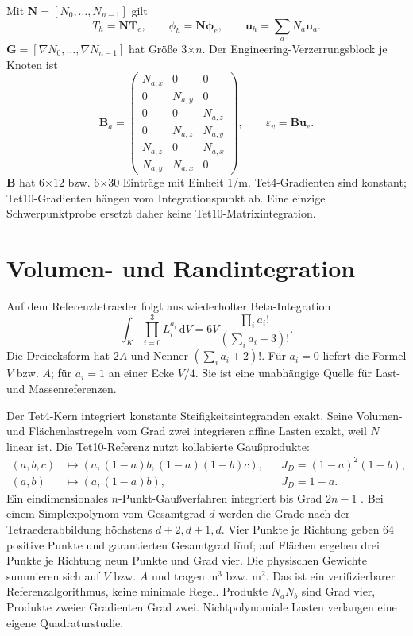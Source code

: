 Mit $\mathbf N=[N_0,\ldots,N_{n-1}]$ gilt
\begin{equation}
T_h=\mathbf N\mathbf T_e,\qquad
\phi_h=\mathbf N\boldsymbol\phi_e,\qquad
\mathbf u_h=\sum_a N_a\mathbf u_a.
\end{equation}
$\mathbf G=[\nabla N_0,\ldots,\nabla N_{n-1}]$ hat Größe 3$\times n$.
Der Engineering-Verzerrungsblock je Knoten ist
\begin{equation}\label{eq:B}
\mathbf B_a=\begin{pmatrix}
N_{a,x}&0&0\\0&N_{a,y}&0\\0&0&N_{a,z}\\
0&N_{a,z}&N_{a,y}\\N_{a,z}&0&N_{a,x}\\N_{a,y}&N_{a,x}&0
\end{pmatrix},\qquad\varepsilon_v=\mathbf B\mathbf u_e.
\end{equation}
$\mathbf B$ hat 6$\times12$ bzw. 6$\times30$ Einträge mit Einheit 1/m.
Tet4-Gradienten sind konstant; Tet10-Gradienten hängen vom Integrationspunkt
ab. Eine einzige Schwerpunktprobe ersetzt daher keine Tet10-Matrixintegration.

\section{Volumen- und Randintegration}
Auf dem Referenztetraeder folgt aus wiederholter Beta-Integration
\begin{equation}\label{eq:simplex-moment}
\int_K\prod_{i=0}^3L_i^{a_i}\,\mathrm dV
=6V\frac{\prod_i a_i!}{(\sum_i a_i+3)!}.
\end{equation}
Die Dreiecksform hat $2A$ und Nenner $(\sum_i a_i+2)!$.
Für $a_i=0$ liefert die Formel $V$ bzw. $A$; für $a_i=1$ an einer Ecke $V/4$.
Sie ist eine unabhängige Quelle für Last- und Massenreferenzen.

Der Tet4-Kern integriert konstante Steifigkeitsintegranden exakt. Seine
Volumen- und Flächenlastregeln vom Grad zwei integrieren affine Lasten exakt,
weil $N$ linear ist. Die Tet10-Referenz nutzt kollabierte Gaußprodukte:
\begin{align}\label{eq:duffy}
(a,b,c)&\mapsto(a,(1-a)b,(1-a)(1-b)c),&&J_D=(1-a)^2(1-b),\\
(a,b)&\mapsto(a,(1-a)b),&&J_D=1-a.\nonumber
\end{align}
Ein eindimensionales $n$-Punkt-Gaußverfahren integriert bis Grad $2n-1$
\cite{nist-quadrature}. Bei einem Simplexpolynom vom Gesamtgrad $d$ werden die
Grade nach der Tetraederabbildung höchstens $d+2,d+1,d$.
Vier Punkte je Richtung geben 64 positive Punkte und garantierten Gesamtgrad
fünf; auf Flächen ergeben drei Punkte je Richtung neun Punkte und Grad vier.
Die physischen Gewichte summieren sich auf $V$ bzw. $A$ und tragen m$^3$ bzw.
m$^2$. Das ist ein verifizierbarer Referenzalgorithmus, keine minimale Regel.
Produkte $N_aN_b$ sind Grad vier, Produkte zweier Gradienten Grad zwei.
Nichtpolynomiale Lasten verlangen eine eigene Quadraturstudie.

